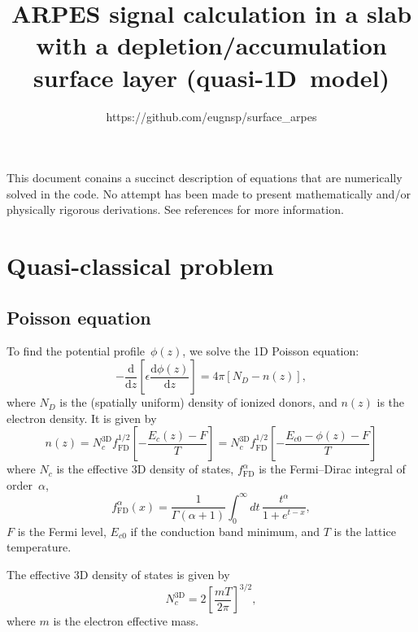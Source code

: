 \documentclass[10pt]{article}
\newcommand{\dd}{\mathrm{d}}
\newcommand{\fFD}{f_{\mathrm{FD}}}
\begin{document}
\title{ARPES signal calculation in a slab with a depletion/accumulation
surface layer (quasi-1D~model)}
\author{https://github.com/eugnsp/surface\_arpes}
\maketitle

This document conains a succinct description of equations that are numerically solved
in the code. No attempt has been made to present mathematically and/or physically
rigorous derivations. See references for more information.

\section{Quasi-classical problem}

\subsection{Poisson equation}

To find the potential profile~$\phi(z)$, we solve the 1D Poisson equation:
\begin{equation}
	\label{eq:poisson}
	- \frac{\dd}{\dd z} \left[ \epsilon \frac{\dd\phi(z)}{\dd z} \right]
	= 4\pi [N_D - n(z)],
\end{equation}
where $N_D$ is the (spatially uniform) density of ionized donors, and $n(z)$ is the
electron density. It is given by
\begin{equation}
	\label{eq:c_density}
	n(z) = N_c^\mathrm{3D} \fFD^{1/2} \left[ -\frac{E_c(z) - F}{T} \right]
	     = N_c^\mathrm{3D} \fFD^{1/2} \left[ -\frac{E_{c0} - \phi(z) - F}{T} \right]
\end{equation}
where $N_c$ is the effective 3D density of states, $\fFD^{\alpha}$ is the Fermi--Dirac
integral of order~$\alpha$,
\begin{equation}
	\fFD^{\alpha}(x) =
	\frac{1}{\Gamma(\alpha + 1)} \int_0^\infty dt\, \frac{t^\alpha}{1 + e^{t - x}},
\end{equation}
$F$ is the Fermi level, $E_{c0}$ if the conduction band minimum,
and $T$ is the lattice temperature.

The effective 3D density of states is given by
\begin{equation}
	N_c^\mathrm{3D} = 2 \left[ \frac{m T}{2\pi} \right]^{3/2},
\end{equation}
where $m$ is the electron effective mass.
\end{document}
